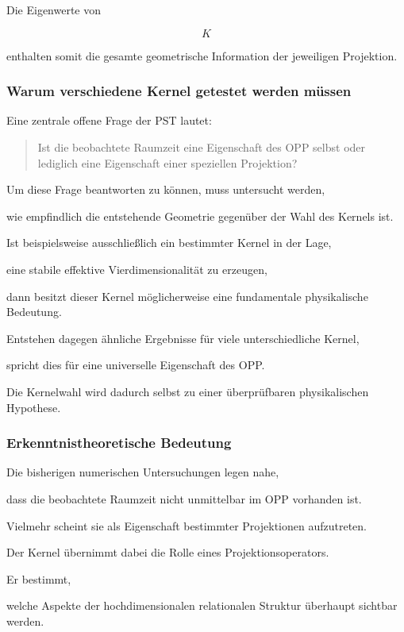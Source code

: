Die Eigenwerte von

\[
K
\]

enthalten somit die gesamte geometrische Information
der jeweiligen Projektion.

\bigskip

\subsubsection{Warum verschiedene Kernel getestet werden müssen}

Eine zentrale offene Frage der PST lautet:

\begin{quote}
Ist die beobachtete Raumzeit eine Eigenschaft des OPP selbst
oder lediglich eine Eigenschaft einer speziellen Projektion?
\end{quote}

Um diese Frage beantworten zu können,
muss untersucht werden,

wie empfindlich die entstehende Geometrie
gegenüber der Wahl des Kernels ist.

Ist beispielsweise ausschließlich ein bestimmter
Kernel in der Lage,

eine stabile effektive Vierdimensionalität
zu erzeugen,

dann besitzt dieser Kernel möglicherweise
eine fundamentale physikalische Bedeutung.

Entstehen dagegen ähnliche Ergebnisse
für viele unterschiedliche Kernel,

spricht dies für eine universelle Eigenschaft
des OPP.

Die Kernelwahl wird dadurch selbst
zu einer überprüfbaren physikalischen Hypothese.

\bigskip

\subsubsection{Erkenntnistheoretische Bedeutung}

Die bisherigen numerischen Untersuchungen legen nahe,

dass die beobachtete Raumzeit nicht unmittelbar
im OPP vorhanden ist.

Vielmehr scheint sie als Eigenschaft
bestimmter Projektionen aufzutreten.

Der Kernel übernimmt dabei die Rolle eines
Projektionsoperators.

Er bestimmt,

welche Aspekte der hochdimensionalen relationalen Struktur
überhaupt sichtbar werden.

